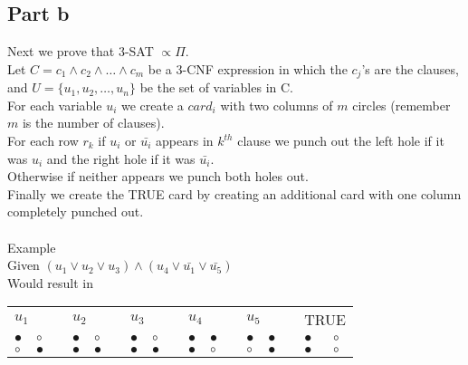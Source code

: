 \documentclass{article}
\begin{document}
    \subsection{Part b}
      Next we prove that 3-SAT $\propto \Pi$.\\
      Let $C = c_{1} \land c_{2} \land \ldots \land c_{m}$ be a 3-CNF expression in which the $c_{j}$'s are the clauses, and $U = \{u_{1}, u_{2}, \ldots, u_{n}\}$ be the set of variables in C.\\
      For each variable $u_{i}$ we create a $card_{i}$ with two columns of $m$ circles (remember $m$ is the number of clauses).\\
      For each row $r_{k}$ if $u_{i}$ or $\bar{u_{i}}$ appears in $k^{th}$ clause we punch out the left hole if it was $u_{i}$ and the right hole if it was $\bar{u_{i}}$.\\
      Otherwise if neither appears we punch both holes out.\\
      Finally we create the TRUE card by creating an additional card with one column completely punched out.\\
      \\
      Example\\
      Given $(u_{1} \lor u_{2} \lor u_{3}) \land (u_{4} \lor \bar{u_{1}} \lor \bar{u_{5}})$\\
      Would result in\\
      \begin{table}[h]
        \begin{tabular}{lllllllllllllllll}
          \multicolumn{2}{l}{$u_{1}$} &  & \multicolumn{2}{l}{$u_{2}$} & & \multicolumn{2}{l}{$u_{3}$} & & \multicolumn{2}{l}{$u_{4}$} & & \multicolumn{2}{l}{$u_{5}$} & & \multicolumn{2}{l}{TRUE}\\ 
          \cline{1-2} \cline{4-5} \cline{7-8} \cline{10-11} \cline{13-14} \cline{16-17} 
          \multicolumn{1}{|l|}{$\bullet$} & \multicolumn{1}{l|}{$\circ$} & & \multicolumn{1}{|l|}{$\bullet$} & \multicolumn{1}{l|}{$\circ$} & & 
          \multicolumn{1}{|l|}{$\bullet$} & \multicolumn{1}{l|}{$\circ$} & & \multicolumn{1}{|l|}{$\bullet$} & \multicolumn{1}{l|}{$\bullet$} & &
          \multicolumn{1}{|l|}{$\bullet$} & \multicolumn{1}{l|}{$\bullet$} & & \multicolumn{1}{|l|}{$\bullet$} & \multicolumn{1}{l|}{$\circ$} \\
          \cline{1-2} \cline{4-5} \cline{7-8} \cline{10-11} \cline{13-14} \cline{16-17} 
          \multicolumn{1}{|l|}{$\circ$} & \multicolumn{1}{l|}{$\bullet$} & & \multicolumn{1}{|l|}{$\bullet$} & \multicolumn{1}{l|}{$\bullet$} & &
          \multicolumn{1}{|l|}{$\bullet$} & \multicolumn{1}{l|}{$\bullet$} & & \multicolumn{1}{|l|}{$\bullet$} & \multicolumn{1}{l|}{$\circ$} & &
          \multicolumn{1}{|l|}{$\circ$} & \multicolumn{1}{l|}{$\bullet$} & & \multicolumn{1}{|l|}{$\bullet$} & \multicolumn{1}{l|}{$\circ$} \\
          \cline{1-2} \cline{4-5} \cline{7-8} \cline{10-11} \cline{13-14} \cline{16-17} 
        \end{tabular}
      \end{table}
\end{document}
